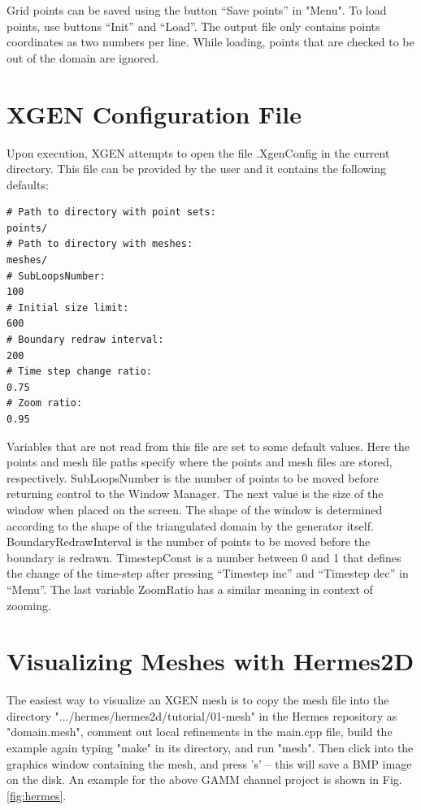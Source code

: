 \documentclass[12pt]{article}
\begin{document}
  Grid points can be saved using the button ``Save points'' in "Menu".
  To load points, use buttons ``Init'' and ``Load''.
  The output file only contains points coordinates as two
  numbers per line. While loading, points that are checked to be
  out of the domain are ignored. 

  \section{XGEN Configuration File}
   
  Upon execution, XGEN attempts to open the file
  .XgenConfig in the current directory. This file 
  can be provided by the user and it contains 
  the following defaults:

  \begin{verbatim} 
# Path to directory with point sets:
points/
# Path to directory with meshes:
meshes/
# SubLoopsNumber:
100
# Initial size limit:
600
# Boundary redraw interval:
200
# Time step change ratio:
0.75
# Zoom ratio:
0.95
  \end{verbatim}
  Variables that are not read from this file are set to some default values.
  Here the points and mesh file paths specify where the points and mesh 
  files are stored, respectively. SubLoopsNumber is the number of
  points to be moved before returning control to the Window Manager.
  The next value is the size of the window when placed on the screen.
  The shape of the window is determined according to the shape
  of the triangulated domain by the generator itself. BoundaryRedrawInterval
  is the number of points to be moved before the boundary is
  redrawn. TimestepConst is a number between 0 and 1 that defines the change of
  the time-step after pressing ``Timestep inc'' and ``Timestep dec'' in ``Menu''.
  The last variable ZoomRatio has a similar meaning in context of zooming.

  \section{Visualizing Meshes with Hermes2D}

  The easiest way to visualize an XGEN mesh is to copy the mesh file into 
  the directory ".../hermes/hermes2d/tutorial/01-mesh" in the Hermes repository
  as "domain.mesh", comment out local refinements
  in the main.cpp file, build the example again typing "make" in its directory, and 
  run "mesh". Then click into the graphics window containing the mesh, and press 's'
  -- this will save a BMP image on the disk. An example for the above GAMM channel
  project is shown in Fig. \ref{fig:hermes}.
\end{document}
